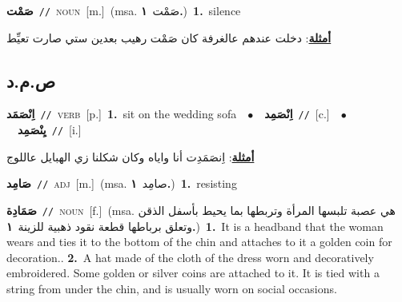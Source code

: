 \documentclass[10pt,a4paper,twoside]{article} %
\begin{document}
\begin{multicols}{2}
{\setlength\topsep{0pt}\textbf{\foreignlanguage{arabic}{صَمْت}}\ {\color{gray}\texttt{//}\color{black}}\ \textsc{noun}\ [m.]\ \color{gray}(msa. \foreignlanguage{arabic}{صَمْت}~\foreignlanguage{arabic}{\textbf{١.}})\color{black}\ \textbf{1.}~silence\  \begin{flushright}\color{gray}\foreignlanguage{arabic}{\textbf{\underline{\foreignlanguage{arabic}{أمثلة}}}: دخلت عندهم عالغرفة كان صَمْت رهيب بعدين ستي صارت تعيِّط}\end{flushright}\color{black}} \vspace{2mm}

\vspace{-3mm}
\subsection*{\color{blue}\foreignlanguage{arabic}{ص.م.د}\color{blue}{}} 

{\setlength\topsep{0pt}\textbf{\foreignlanguage{arabic}{اِنْصَمَد}}\ {\color{gray}\texttt{//}\color{black}}\ \textsc{verb}\ [p.]\ \textbf{1.}~sit on the wedding sofa\ \ $\bullet$\ \ \setlength\topsep{0pt}\textbf{\foreignlanguage{arabic}{اِنْصَمِد}}\ {\color{gray}\texttt{//}\color{black}}\ [c.]\ \ $\bullet$\ \ \setlength\topsep{0pt}\textbf{\foreignlanguage{arabic}{يِنْصَمِد}}\ {\color{gray}\texttt{//}\color{black}}\ [i.]\  \begin{flushright}\color{gray}\foreignlanguage{arabic}{\textbf{\underline{\foreignlanguage{arabic}{أمثلة}}}: اِنصَمَدِت أنا واياه وكان شكلنا زي الهبايل عاللوج}\end{flushright}\color{black}} \vspace{2mm}

{\setlength\topsep{0pt}\textbf{\foreignlanguage{arabic}{صَامِد}}\ {\color{gray}\texttt{//}\color{black}}\ \textsc{adj}\ [m.]\ \color{gray}(msa. \foreignlanguage{arabic}{صامِد}~\foreignlanguage{arabic}{\textbf{١.}})\color{black}\ \textbf{1.}~resisting\ } \vspace{2mm}

{\setlength\topsep{0pt}\textbf{\foreignlanguage{arabic}{صَمَادِة}}\ {\color{gray}\texttt{//}\color{black}}\ \textsc{noun}\ [f.]\ \color{gray}(msa. \foreignlanguage{arabic}{هي عصبة تلبسها المرأة وتربطها بما يحيط بأسفل الذقن وتعلق برباطها قطعة نقود ذهبية للزينة}~\foreignlanguage{arabic}{\textbf{١.}})\color{black}\ \textbf{1.}~It is a headband that the woman wears and ties it to the bottom of the chin and attaches to it a golden coin for decoration..  \textbf{2.}~A hat made of the cloth of the dress worn and decoratively embroidered. Some golden or silver coins are attached to it. It is tied with a string from under the chin, and is usually worn on social occasions.\ } \vspace{2mm}


\end{multicols}
\end{document}
